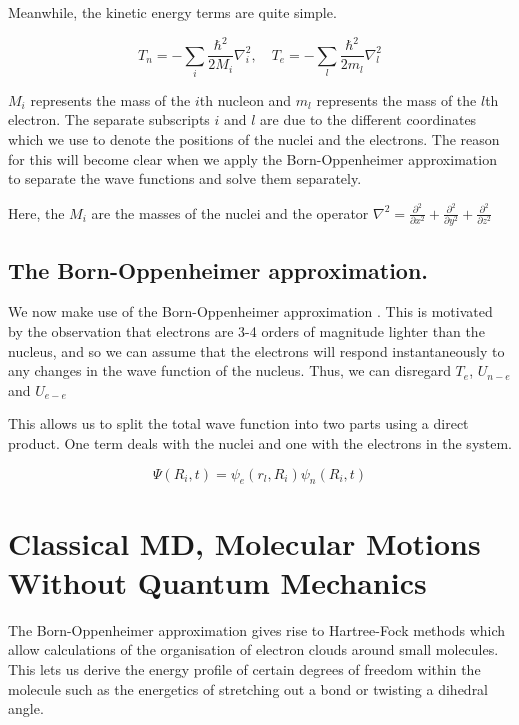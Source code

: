 Meanwhile, the kinetic energy terms are quite simple. 

\begin {equation}
T_n = - \sum_i \frac{\hbar^2}{2M_i} \nabla_i ^2,\quad  T_e = - \sum_l \frac{\hbar^2}{2m_l} \nabla_l ^2
\end {equation}

$M_i$ represents the mass of the $i$th nucleon and $m_l$ represents the mass of the $l$th electron. The separate subscripts $i$ and $l$ are due to the different coordinates which we use to denote the positions of the nuclei and the electrons. The reason for this will become clear when we apply the Born-Oppenheimer approximation to separate the wave functions and solve them separately.

Here, the $M_i$ are the masses of the nuclei and the operator $\nabla^2 = \frac{\partial^2}{\partial x^2} + \frac{\partial^2 }{\partial y^2} + \frac{\partial^2}{\partial z^2} $


\subsection{The Born-Oppenheimer approximation.}
We now make use of the Born-Oppenheimer approximation \cite{Born1927}. This is motivated by the observation that electrons are 3-4 orders of magnitude lighter than the nucleus, and so we can assume that the electrons will respond instantaneously to any changes in the wave function of the nucleus. Thus, we can disregard $T_e$, $U_{n-e}$ and $U_{e-e}$ 


This allows us to split the total wave function into two parts using a direct product. One term deals with the nuclei and one with the electrons in the system. 

\begin {equation}
\Psi(R_i,t) = \psi_e (r_l,R_i) \psi_n(R_i,t)
\end {equation}

\section{Classical MD, Molecular Motions Without Quantum Mechanics}
The Born-Oppenheimer approximation gives rise to Hartree-Fock methods which allow calculations of the organisation of electron clouds around small molecules. This lets us derive the energy profile of certain degrees of freedom within the molecule such as the energetics of stretching out a bond or twisting a dihedral angle. 

